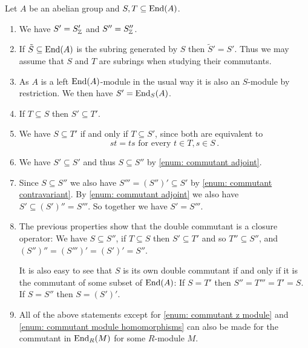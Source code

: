 \begin{rem}
  Let $A$ be an abelian group and $S, T \subseteq \operatorname{End}(A)$.
  \begin{enumerate}[label=\emph{\alph*}),leftmargin=*]
    \item \label{enum: commutant z module}
      We have $S' = S'_{\mathbb{Z}}$ and $S'' = S''_{\mathbb{Z}}$.
    \item
      If $\tilde{S} \subseteq \operatorname{End}(A)$ is the subring generated by $S$ then $\tilde{S}' = S'$.
      Thus we may assume that $S$ and $T$ are subrings when studying their commutants.
    \item \label{enum: commutant module homomorphisms}
      As $A$ is a left $\operatorname{End}(A)$-module in the usual way it is also an $S$-module by restriction.
      We then have $S' = \operatorname{End}_S(A)$.
    \item \label{enum: commutant contravariant}
      If $T \subseteq S$ then $S' \subseteq T'$.
    \item \label{enum: commutant adjoint}
      We have $S \subseteq T'$ if and only if $T \subseteq S'$, since both are equivalent to
      \[
        st = ts
        \text{ for every }
        t \in T,
        s \in S \,.
      \]
    \item
      We have $S' \subseteq S'$ and thus $S \subseteq S''$ by \ref{enum: commutant adjoint}.
    \item
      Since $S \subseteq S''$ we also have $S''' = (S'')' \subseteq S'$ by \ref{enum: commutant contravariant}.
      By \ref{enum: commutant adjoint} we also have $S' \subseteq (S')'' = S'''$.
      So together we have $S' = S'''$.
    \item
      The previous properties show that the double commutant is a closure operator:
      We have $S \subseteq S''$, if $T \subseteq S$ then $S' \subseteq T'$ and so $T'' \subseteq S''$, and $(S'')'' = (S''')' = (S')' = S''$.
      
      It is also easy to see that $S$ is its own double commutant if and only if it is the commutant of some subset of $\operatorname{End}(A)$:
      If $S = T'$ then $S'' = T''' = T' = S$.
      If $S = S''$ then $S = (S')'$.
    \item
      All of the above statements except for \ref{enum: commutant z module} and \ref{enum: commutant module homomorphisms} can also be made for the commutant in $\operatorname{End}_R(M)$ for some $R$-module $M$.
  \end{enumerate}
\end{rem}


